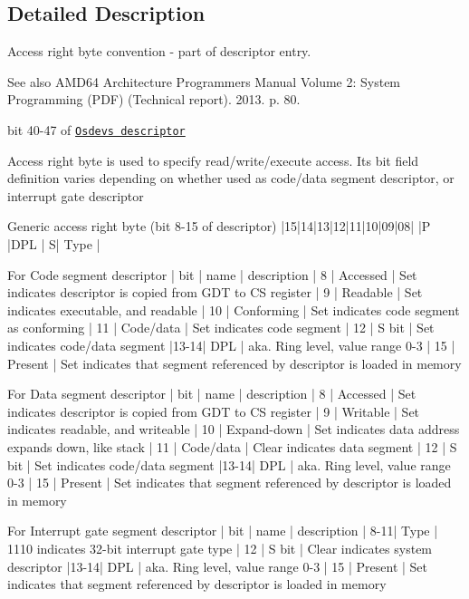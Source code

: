 \subsection{Detailed Description}
Access right byte convention -\/ part of descriptor entry. 

\begin{DoxySeeAlso}{See also}
A\+M\+D64 Architecture Programmer\textquotesingle{}s Manual Volume 2\+: System Programming (P\+DF) (Technical report). 2013. p. 80. 

bit 40-\/47 of \href{https://wiki.osdev.org/Descriptor}{\tt Osdev\textquotesingle{}s descriptor}
\end{DoxySeeAlso}
Access right byte is used to specify read/write/execute access. Its bit field definition varies depending on whether used as code/data segment descriptor, or interrupt gate descriptor \begin{DoxyVerb}Generic access right byte (bit 8-15 of descriptor)
|15|14|13|12|11|10|09|08|
|P |DPL  | S|    Type   |

For Code segment descriptor
| bit | name       | description
|   8 | Accessed   | Set indicates descriptor is copied from GDT to CS register
|   9 | Readable   | Set indicates executable, and readable
|  10 | Conforming | Set indicates code segment as conforming
|  11 | Code/data  | Set indicates code segment
|  12 | S bit      | Set indicates code/data segment
|13-14| DPL        | aka. Ring level, value range 0-3
|  15 | Present    | Set indicates that segment referenced by descriptor is loaded in memory

For Data segment descriptor
| bit | name        | description
|   8 | Accessed    | Set indicates descriptor is copied from GDT to CS register
|   9 | Writable    | Set indicates readable, and writeable
|  10 | Expand-down | Set indicates data address expands down, like stack
|  11 | Code/data   | Clear indicates data segment
|  12 | S bit       | Set indicates code/data segment
|13-14| DPL         | aka. Ring level, value range 0-3
|  15 | Present     | Set indicates that segment referenced by descriptor is loaded in memory

For Interrupt gate segment descriptor
| bit | name       | description
| 8-11| Type       | 1110 indicates 32-bit interrupt gate type
|  12 | S bit      | Clear indicates system descriptor
|13-14| DPL        | aka. Ring level, value range 0-3
|  15 | Present    | Set indicates that segment referenced by descriptor is loaded in memory
\end{DoxyVerb}
 

